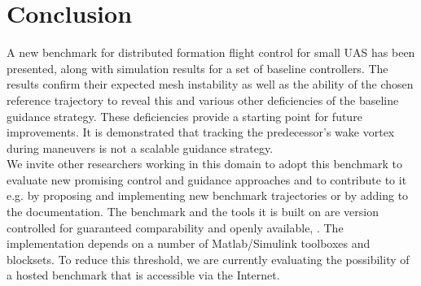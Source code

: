 \documentclass{ifacconf}
\begin{document}
\section{Conclusion}
\label{sec:conclusio}
A new benchmark for distributed formation flight control for small UAS has been presented, along with simulation results for a set of baseline controllers. The results confirm their expected mesh instability as well as the ability of the chosen reference trajectory to reveal this and various other deficiencies of the baseline guidance strategy. These deficiencies provide a starting point for future improvements. It is demonstrated that tracking the predecessor's wake vortex during maneuvers is not a scalable guidance strategy. \\
We invite other researchers working in this domain to adopt this benchmark to evaluate new promising control and guidance approaches and to contribute to it e.g. by proposing and implementing new benchmark trajectories or by adding to the documentation. The benchmark and the tools it is built on are version controlled for guaranteed comparability and openly available, \cite{UAV3D,uavsimblockset,ffb,STRAGE}. The implementation depends on a number of Matlab/Simulink toolboxes and blocksets. To reduce this threshold, we are currently evaluating the possibility of a hosted benchmark that is accessible via the Internet.
%
      
\end{document}
